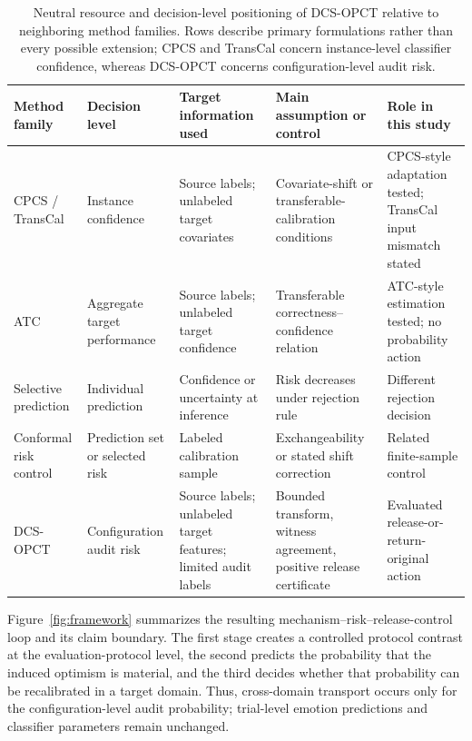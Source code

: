 \documentclass[preprint,12pt]{elsarticle}
\begin{document}
\begin{table}[t]
\centering
\caption{Neutral resource and decision-level positioning of DCS-OPCT relative to neighboring method families. Rows describe primary formulations rather than every possible extension; CPCS and TransCal concern instance-level classifier confidence, whereas DCS-OPCT concerns configuration-level audit risk.}
\label{tab:capability-matrix}
\footnotesize
\setlength{\tabcolsep}{2.8pt}
\renewcommand{\arraystretch}{1.12}
\begin{tabular}{>{\raggedright\arraybackslash}p{}>{\raggedright\arraybackslash}p{}>{\raggedright\arraybackslash}p{}>{\raggedright\arraybackslash}p{}>{\raggedright\arraybackslash}p{}}
\toprule
Method family & Decision level & Target information used & Main assumption or control & Role in this study \\
\midrule
CPCS / TransCal & Instance confidence & Source labels; unlabeled target covariates & Covariate-shift or transferable-calibration conditions & CPCS-style adaptation tested; TransCal input mismatch stated \\
ATC & Aggregate target performance & Source labels; unlabeled target confidence & Transferable correctness--confidence relation & ATC-style estimation tested; no probability action \\
Selective prediction & Individual prediction & Confidence or uncertainty at inference & Risk decreases under rejection rule & Different rejection decision \\
Conformal risk control & Prediction set or selected risk & Labeled calibration sample & Exchangeability or stated shift correction & Related finite-sample control \\
DCS-OPCT & Configuration audit risk & Source labels; unlabeled target features; limited audit labels & Bounded transform, witness agreement, positive release certificate & Evaluated release-or-return-original action \\
\bottomrule
\end{tabular}
\end{table}

Figure~\ref{fig:framework} summarizes the resulting mechanism--risk--release-control loop and its claim boundary. The first stage creates a controlled protocol contrast at the evaluation-protocol level, the second predicts the probability that the induced optimism is material, and the third decides whether that probability can be recalibrated in a target domain. Thus, cross-domain transport occurs only for the configuration-level audit probability; trial-level emotion predictions and classifier parameters remain unchanged.
\end{document}
